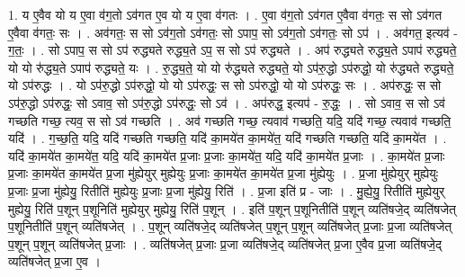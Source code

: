 \documentclass[17pt]{extarticle}
\begin{document}
1. य ए॒वैव यो य ए॒वा व॑ग॒तो ऽव॑गत ए॒व यो य ए॒वा व॑गतः । . ए॒वा व॑ग॒तो ऽव॑गत ए॒वैवा व॑गतः॒ स सो ऽव॑गत ए॒वैवा व॑गतः॒ सः । . अव॑गतः॒ स सो ऽव॑ग॒तो ऽव॑गतः॒ सो ऽपाप॒ सो ऽव॑ग॒तो ऽव॑गतः॒ सो ऽप॑ । . अव॑गत॒ इत्यव॑ - ग॒तः॒ । . सो ऽपाप॒ स सो ऽप॑ रुद्ध्यते रुद्ध्य॒ते ऽप॒ स सो ऽप॑ रुद्ध्यते । . अप॑ रुद्ध्यते रुद्ध्य॒ते ऽपाप॑ रुद्ध्यते॒ यो यो रु॑द्ध्य॒ते ऽपाप॑ रुद्ध्यते॒ यः । . रु॒द्ध्य॒ते॒ यो यो रु॑द्ध्यते रुद्ध्यते॒ यो ऽप॑रु॒द्धो ऽप॑रुद्धो॒ यो रु॑द्ध्यते रुद्ध्यते॒ यो ऽप॑रुद्धः । . यो ऽप॑रु॒द्धो ऽप॑रुद्धो॒ यो यो ऽप॑रुद्धः॒ स सो ऽप॑रुद्धो॒ यो यो ऽप॑रुद्धः॒ सः । . अप॑रुद्धः॒ स सो ऽप॑रु॒द्धो ऽप॑रुद्धः॒ सो ऽवाव॒ सो ऽप॑रु॒द्धो ऽप॑रुद्धः॒ सो ऽव॑ । . अप॑रुद्ध॒ इत्यप॑ - रु॒द्धः॒ । . सो ऽवाव॒ स सो ऽव॑ गच्छति गच्छ॒ त्यव॒ स सो ऽव॑ गच्छति । . अव॑ गच्छति गच्छ॒ त्यवाव॑ गच्छति॒ यदि॒ यदि॑ गच्छ॒ त्यवाव॑ गच्छति॒ यदि॑ । . ग॒च्छ॒ति॒ यदि॒ यदि॑ गच्छति गच्छति॒ यदि॑ का॒मये॑त का॒मये॑त॒ यदि॑ गच्छति गच्छति॒ यदि॑ का॒मये॑त । . यदि॑ का॒मये॑त का॒मये॑त॒ यदि॒ यदि॑ का॒मये॑त प्र॒जाः प्र॒जाः का॒मये॑त॒ यदि॒ यदि॑ का॒मये॑त प्र॒जाः । . का॒मये॑त प्र॒जाः प्र॒जाः का॒मये॑त का॒मये॑त प्र॒जा मु॑ह्येयुर् मुह्येयुः प्र॒जाः का॒मये॑त का॒मये॑त प्र॒जा मु॑ह्येयुः । . प्र॒जा मु॑ह्येयुर् मुह्येयुः प्र॒जाः प्र॒जा मु॑ह्येयु॒ रितीति॑ मुह्येयुः प्र॒जाः प्र॒जा मु॑ह्येयु॒ रिति॑ । . प्र॒जा इति॑ प्र - जाः । . मु॒ह्ये॒यु॒ रितीति॑ मुह्येयुर् मुह्येयु॒ रिति॑ प॒शून् प॒शूनिति॑ मुह्येयुर् मुह्येयु॒ रिति॑ प॒शून् । . इति॑ प॒शून् प॒शूनितीति॑ प॒शून् व्यति॑षजे॒द् व्यति॑षजेत् प॒शूनितीति॑ प॒शून् व्यति॑षजेत् । . प॒शून् व्यति॑षजे॒द् व्यति॑षजेत् प॒शून् प॒शून् व्यति॑षजेत् प्र॒जाः प्र॒जा व्यति॑षजेत् प॒शून् प॒शून् व्यति॑षजेत् प्र॒जाः । . व्यति॑षजेत् प्र॒जाः प्र॒जा व्यति॑षजे॒द् व्यति॑षजेत् प्र॒जा ए॒वैव प्र॒जा व्यति॑षजे॒द् व्यति॑षजेत् प्र॒जा ए॒व । \newline
\end{document}
